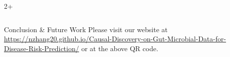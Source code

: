 \documentclass[final]{beamer}
\newlength{\sepwidth}
\newlength{\colwidth}
\newcommand{\separatorcolumn}{\begin{column}{\sepwidth}\end{column}}
\begin{document}
\begin{frame}[t]
\begin{columns}[t]
\begin{column}{2\colwidth + \sepwidth}
\begin{columns}[t]
\begin{column}{\colwidth}
\begin{block}{Conclusion \& Future Work}
        Please visit our website at \href{https://nzhang20.github.io/Causal-Discovery-on-Gut-Microbial-Data-for-Disease-Risk-Prediction/}{https://nzhang20.github.io/Causal-Discovery-on-Gut-Microbial-Data-for-Disease-Risk-Prediction/} or at the above QR code.
          
      \end{block}

    \end{column}
  \end{columns}

\end{column}
\separatorcolumn
\end{columns}
\end{frame}
\end{document}
